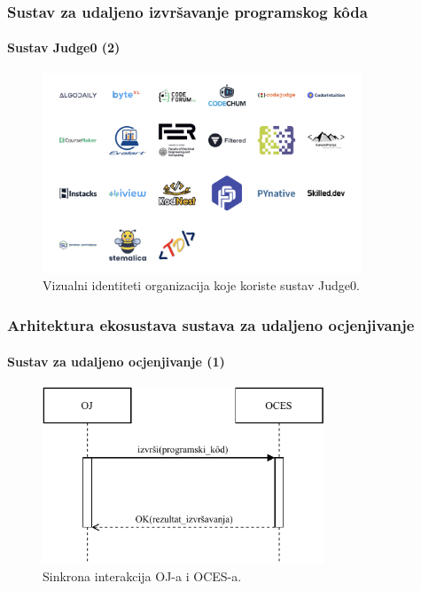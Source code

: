 \documentclass{beamer}
\newif\ifplacelogo
\begin{document}
\placelogofalse
\begin{frame}
\frametitle{Sustav za udaljeno izvršavanje programskog kôda}
\framesubtitle{Sustav Judge0 (2)}
\begin{figure}[htb]
	\centering
	\includegraphics[width=0.85\textwidth]{images/Judge0 Clients.png}
	\caption{
		Vizualni identiteti organizacija koje koriste sustav Judge0. \citep{Judge0Web}
	}
\end{figure}
\end{frame}
\placelogotrue

\begin{frame}
\frametitle{Arhitektura ekosustava sustava za udaljeno ocjenjivanje}
\framesubtitle{Sustav za udaljeno ocjenjivanje (1)}
\begin{figure}[htb]
	\centering
	\includegraphics[width=0.75\textwidth]{images/Sync Interakcija.pdf}
	\caption{
		Sinkrona interakcija OJ-a i OCES-a.
	}
\end{figure}
\end{frame}
\end{document}
